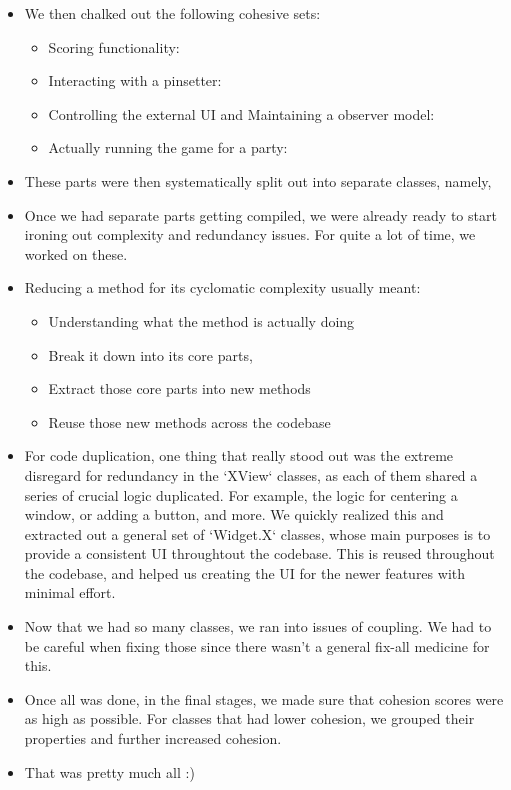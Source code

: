 \begin{itemize}
    \item We then chalked out the following cohesive sets:
          \begin{itemize}
              \item Scoring functionality: 
              \item Interacting with a pinsetter: 
              \item Controlling the external UI and Maintaining a observer model: 
              \item Actually running the game for a party: 
          \end{itemize}

    \item These parts were then systematically split out into separate classes, namely, 
    \item Once we had separate parts getting compiled, we were already ready to start ironing out complexity and redundancy issues. For quite a lot of time, we worked on these.
    \item Reducing a method for its cyclomatic complexity usually meant:
        \begin{itemize}
            \item Understanding what the method is actually doing
            \item Break it down into its core parts,
            \item Extract those core parts into new methods
            \item Reuse those new methods across the codebase
        \end{itemize}
    \item For code duplication, one thing that really stood out was the extreme disregard for redundancy in the `XView` classes, as each of them shared a series of crucial logic duplicated. For example, the logic for centering a window, or adding a button, and more. We quickly realized this and extracted out a general set of `Widget.X` classes, whose main purposes is to provide a consistent UI throughtout the codebase. This is reused throughout the codebase, and helped us creating the UI for the newer features with minimal effort.
    \item Now that we had so many classes, we ran into issues of coupling. We had to be careful when fixing those since there wasn't a general fix-all medicine for this.
    \item Once all was done, in the final stages, we made sure that cohesion scores were as high as possible. For classes that had lower cohesion, we grouped their properties and further increased cohesion.
    \item That was pretty much all :)
\end{itemize}

